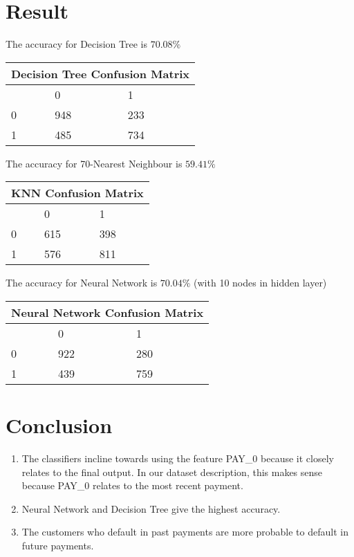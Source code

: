 \documentclass{article}
\begin{document}
\section{Result}
\noindent The accuracy for Decision Tree is $70.08 \%$
\begin{center}
\begin{tabular}{ |p{3cm}|p{3cm}|p{3cm}|  }
\hline
\multicolumn{3}{|c|}{Decision Tree Confusion Matrix } \\
 \hline
 & 0 & 1\\
 \hline
 0&948    &233\\
 1&485  & 734 \\
 
 \hline
\end{tabular}
\end{center}

\noindent The accuracy for 70-Nearest Neighbour is $59.41 \%$


\begin{center}
\begin{tabular}{ |p{3cm}|p{3cm}|p{3cm}|  }
\hline
\multicolumn{3}{|c|}{KNN Confusion Matrix } \\
 \hline
 & 0 & 1\\
 \hline
 0&615    &398\\
 1&576  & 811 \\
 
 \hline
\end{tabular}
\end{center}

\noindent The accuracy for Neural Network is $70.04 \%$ (with 10 nodes in hidden layer)

\begin{center}
\begin{tabular}{ |p{3cm}|p{3cm}|p{3cm}|  }
\hline
\multicolumn{3}{|c|}{Neural Network Confusion Matrix } \\
 \hline
 & 0 & 1\\
 \hline
 0&922    &280\\
 1&439  & 759 \\
 
 \hline
\end{tabular}
\end{center}

\section{Conclusion}
\begin{enumerate}

\item The classifiers incline towards using the feature PAY\_0 because it closely relates to the final output. In our dataset description, this makes sense because PAY\_0 relates to the most recent payment.

\item Neural Network and Decision Tree give the highest accuracy.

\item The customers who default in past payments are more probable to default in future payments.


\end{enumerate}
\end{document}
